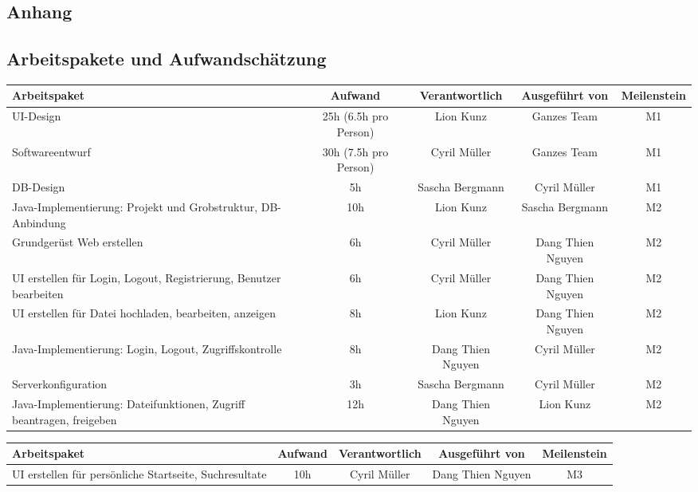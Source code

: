 \begin{landscape}
\section{Anhang}
\subsection{Arbeitspakete und Aufwandschätzung}
\label{sub:arbeitspakete_und_aufwandschaetzung}
\begin{tabularx}{\linewidth}{|X|c|c|c|c|} \hline
\textbf{Arbeitspaket}&	\textbf{Aufwand}&		\textbf{Verantwortlich}&	\textbf{Ausgeführt von}&	\textbf{Meilenstein}\\ \hline
UI-Design 																&	25h (6.5h pro Person)	&	Lion Kunz		&	Ganzes Team&	M1\\ \hline
Softwareentwurf															&	30h (7.5h pro Person)	&	Cyril Müller	&	Ganzes Team&	M1\\ \hline
DB-Design																&	5h	&	Sascha Bergmann	&	Cyril Müller&	M1\\ \hline
Java-Implementierung: Projekt und Grobstruktur, DB-Anbindung			&	10h	&	Lion Kunz		&	Sascha Bergmann&	M2\\ \hline
Grundgerüst Web erstellen												&	6h 	&	Cyril Müller	&	Dang Thien Nguyen&	M2\\ \hline
UI erstellen für Login, Logout, Registrierung, Benutzer bearbeiten		&	6h	&	Cyril Müller	&	Dang Thien Nguyen&	M2\\ \hline
UI erstellen für Datei hochladen, bearbeiten, anzeigen					&	8h	&	Lion Kunz		&	Dang Thien Nguyen&	M2\\ \hline
Java-Implementierung: Login, Logout, Zugriffskontrolle					&	8h	&	Dang Thien Nguyen&	Cyril Müller&	M2\\ \hline
Serverkonfiguration														&	3h	&	Sascha Bergmann	&	Cyril Müller&	M2\\ \hline
Java-Implementierung: Dateifunktionen, Zugriff beantragen, freigeben	&	12h	&	Dang Thien Nguyen&	Lion Kunz&	M2\\ \hline
\end{tabularx}
\clearpage
\begin{tabularx}{\linewidth}{|X|c|c|c|c|} \hline
\textbf{Arbeitspaket}&	\textbf{Aufwand}&		\textbf{Verantwortlich}&	\textbf{Ausgeführt von}&	\textbf{Meilenstein}\\ \hline
UI erstellen für persönliche Startseite, Suchresultate					&	10h	&	Cyril Müller	&	Dang Thien Nguyen&	M3\\ \hline

\end{tabularx}
\end{landscape}

